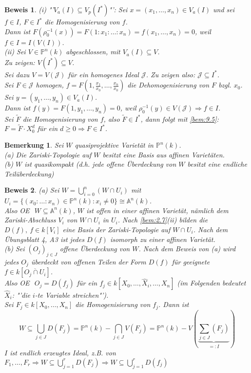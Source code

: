\documentclass[a4paper,12pt]{report}
\theoremstyle{break}
\newtheorem{Bem}[Def]{Bemerkung}
\theoremstyle{nonumberbreak}
\theoremstyle{nonumberplain}
\newtheorem{Bew}{Beweis}
\renewcommand{\OE}{O\!\!E~}
\begin{document}
\begin{Bew}
(i) "'$V_a(I)\subseteq V_p(I^*)$"': Sei $x=(x_1,\dots,x_n)\in V_a(I)$ und sei $f\in I$, $F\in I^*$ die Homogenisierung von $f$.\\
Dann ist $F(\rho_0^{-1}(x))=F(1:x_1:\dots:x_n)=f(x_1,\dots,x_n)=0$, weil $f\in I =I(V(I))$.\\
(ii) Sei $V\in \mathbb{P}^n(k)$ abgeschlossen, mit $V_a(I)\subseteq V$.\\
Zu zeigen: $V(I^*)\subseteq V$.\\
Sei dazu $V=V(\mathcal{J})$ für ein homogenes Ideal $\mathcal{J}$. Zu zeigen also: $\mathcal{J}\subseteq I^*$.\\
Sei $F\in \mathcal{J}$ homogen, $f=F(1,\frac{x_1}{x_0},\dots,\frac{x_n}{x_0})$ die Dehomogenisierung von $F$ bzgl. $x_0$.\\
Sei $y=(y_1,\dots,y_n)\in V_a(I)$.\\
Dann ist $f(y)=F(1,y_1,\dots,y_n)=0$, weil $\rho_0^{-1}(y)\in V(\mathcal{J})\Rightarrow f\in I$.\\
Sei $\tilde{F}$ die Homogenisierung von $f$, also $\tilde{F}\in I^*$, dann folgt mit \ref{bem:9.5}: $F=\tilde{F}\cdot X_0^d$ für ein $d\geq0\Rightarrow F\in I^*$.
\end{Bew}



\begin{Bem}
\label{bem:9.9}
Sei $W$ quasiprojektive Varietät in $\mathbb{P}^n(k)$.\\
(a) Die Zariski-Topologie auf $W$ besitzt eine Basis aus affinen Varietäten.\\
(b) $W$ ist quasikompakt (d.h. jede offene Überdeckung von $W$ besitzt eine endliche Teilüberdeckung)
\end{Bem}

\begin{Bew}
(a) Sei $W=\bigcup_{i=0}^n(W\cap U_i)$ mit $U_i=\{(x_0:\dots:x_n)\in\mathbb{P}^n(k):x_i\neq 0\}\cong\mathbb{A}^n(k)$.\\
Also \OE $~W\subseteq\mathbb{A}^n(k)$, $W$ ist offen in einer affinen Varietät, nämlich dem Zariski-Abschluss $V_i$ von $W\cap U_i$ in $U_i$. Nach \ref{bem:2.7}(ii) bilden die $D(f),~f\in k[V_i]$ eine Basis der Zariski-Topologie auf $W\cap U_i$. Nach dem Übungsblatt 4, A3 ist jedes $D(f)$ isomorph zu einer affinen Varietät.\\
(b) Sei $(O_j)_{j\in J}$ offene Überdeckung von $W$. Nach dem Beweis von (a) wird jedes $O_j$ überdeckt von offenen Teilen der Form $D(f)$ für geeignete $f\in k[\overline{O_j\cap U_i}]$.\\
Also \OE $~O_j=D(f_j)$ für ein $f_j\in k[X_0,\dots,\hat{X}_i,\dots,X_n]$ (im Folgenden bedeutet $\hat{X}_i$: "'die $i$-te Variable streichen"').\\
Sei $F_j\in k[X_0,\dots,X_n]$ die Homogenisierung von $f_j$. Dann ist
$$W\subseteq \bigcup_{j\in J}D(F_j)=\mathbb{P}^n(k) - \bigcap_{j\in J}V(F_j)=\mathbb{P}^n(k) - V(\underbrace{\sum_{j\in J}(F_j)}_{=:I})$$
$I$ ist endlich erzeugtes Ideal, z.B. von $F_1,\dots,F_r\Rightarrow W\subseteq\bigcup_{j=1}^rD(F_j)\Rightarrow W\subseteq \bigcup_{j=1}^rD(f_j)$
\end{Bew}
\end{document}
